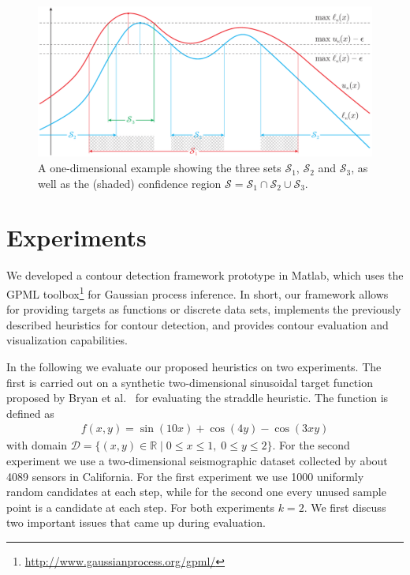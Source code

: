 \documentclass[11pt]{article} %
\begin{document}
\begin{figure}[tb]
  \centering
  \includegraphics[width=\textwidth]{figures/cb_eps}
  \caption{A one-dimensional example showing the three sets $\mathcal{S}_1$,
           $\mathcal{S}_2$ and $\mathcal{S}_3$, as well as
           the (shaded) confidence region
           $\mathcal{S} = \mathcal{S}_1\cap\mathcal{S}_2\cup\mathcal{S}_3$.}
  \label{fig:cbe}
  \vspace{-0.5em}
\end{figure}

\section{Experiments} \label{sect:exp}
We developed a contour detection framework prototype in Matlab, which uses the
GPML toolbox\footnote{\url{http://www.gaussianprocess.org/gpml/}} for
Gaussian process inference. In short, our framework allows for providing
targets as functions or discrete data sets,
implements the previously described heuristics for contour detection, and
provides contour evaluation and visualization capabilities.

In the following we evaluate our proposed heuristics on two experiments.
The first is carried out on a synthetic two-dimensional sinusoidal target
function proposed by Bryan et al.~\cite{bryan2005} for evaluating the straddle
heuristic. The function is defined as
\begin{align*}
  f(x, y) = \sin(10x) + \cos(4y) - \cos(3xy)
\end{align*}
with domain
$\mathcal{D} = \{(x, y) \in \mathbb{R} \mid 0 \leq x \leq 1,\;0 \leq y \leq 2\}$.
For the second experiment we use a two-dimensional seismographic dataset
collected by about 4089 sensors in California. For the first experiment
we use 1000 uniformly random candidates at each step, while for the second
one every unused sample point is a candidate at each step. For both
experiments $k = 2$.
We first discuss two important issues that came up during evaluation.
\end{document}
